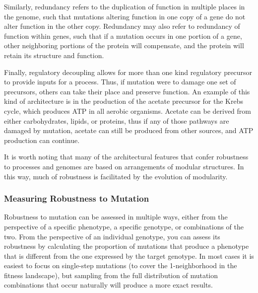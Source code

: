 \documentclass[PhD]{msu-thesis}
\begin{document}
Similarly, redundancy refers to the duplication of function in multiple places in the genome, such that mutations altering function in one copy of a gene do not alter function in the other copy. Redundancy may also refer to redundancy of function within genes, such that if a mutation occurs in one portion of a gene, other neighboring portions of the protein will compensate, and the protein will retain its structure and function.\cite{wagner_distributed_2005} 

Finally, regulatory decoupling allows for more than one kind regulatory precursor to provide inputs for a process\cite{wagner_distributed_2005}. Thus, if mutation were to damage one set of precursors, others can take their place and preserve function. An example of this kind of architecture is in the production of the acetate precursor for the Krebs cycle, which produces ATP in all aerobic organisms\cite{baldwin_evolution_1981}. Acetate can be derived from either carbohydrates, lipids, or proteins, thus if any of those pathways are damaged by mutation, acetate can still be produced from other sources, and ATP production can continue.

It is worth noting that many of the architectural features that confer robustness to processes and genomes are based on arrangements of modular structures\cite{stelling_robustness_2004,wagner_road_2007}. In this way, much of robustness is facilitated by the evolution of modularity.



\subsubsection{Measuring Robustness to Mutation}

Robustness to mutation can be assessed in multiple ways, either from the perspective of a specific phenotype, a specific genotype, or combinations of the two. From the perspective of an individual genotype, you can assess its robustness by calculating the proportion of mutations that produce a phenotype that is different from the one expressed by the target genotype\cite{andreas_wagner_robustness_2008}. In most cases it is easiest to focus on single-step mutations (to cover the 1-neighborhood in the fitness landscape), but sampling from the full distribution of mutation combinations that occur naturally will produce a more exact results.
\end{document}
